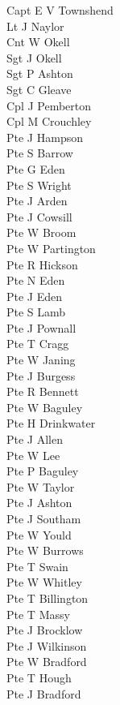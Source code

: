 \begin{multicols}{2}
  \noindent
  Capt E V Townshend \\
  Lt J Naylor \\
  Cnt W Okell \\
  Sgt J Okell \\
  Sgt P Ashton \\
  Sgt C Gleave \\
  Cpl J Pemberton \\
  Cpl M Crouchley \\
  Pte J Hampson \\
  Pte S Barrow \\
  Pte G Eden \\
  Pte S Wright \\
  Pte J Arden \\
  Pte J Cowsill \\
  Pte W Broom \\
  Pte W Partington \\
  Pte R Hickson \\
  Pte N Eden \\
  Pte J Eden \\
  Pte S Lamb \\
  Pte J Pownall \\
  Pte T Cragg \\
  Pte W Janing \\
  Pte J Burgess \\
  Pte R Bennett \\
  Pte W Baguley \\
  Pte H Drinkwater \\
  Pte J Allen \\
  Pte W Lee \\
  Pte P Baguley \\
  Pte W Taylor \\
  Pte J Ashton \\
  Pte J Southam \\
  Pte W Yould \\
  Pte W Burrows \\
  Pte T Swain \\
  Pte W Whitley \\
  Pte T Billington \\
  Pte T Massy \\
  Pte J Brocklow \\
  Pte J Wilkinson \\
  Pte W Bradford \\
  Pte T Hough \\
  Pte J Bradford \\

\end{multicols}

